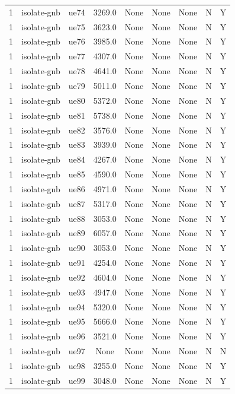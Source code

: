\begin{table}[ht]
\begin{tabular}{|c|c|c|c|c|c|c|c|c|}
1 & isolate-gnb & ue74 & 3269.0 & None & None & None & N & Y \\
1 & isolate-gnb & ue75 & 3623.0 & None & None & None & N & Y \\
1 & isolate-gnb & ue76 & 3985.0 & None & None & None & N & Y \\
1 & isolate-gnb & ue77 & 4307.0 & None & None & None & N & Y \\
1 & isolate-gnb & ue78 & 4641.0 & None & None & None & N & Y \\
1 & isolate-gnb & ue79 & 5011.0 & None & None & None & N & Y \\
1 & isolate-gnb & ue80 & 5372.0 & None & None & None & N & Y \\
1 & isolate-gnb & ue81 & 5738.0 & None & None & None & N & Y \\
1 & isolate-gnb & ue82 & 3576.0 & None & None & None & N & Y \\
1 & isolate-gnb & ue83 & 3939.0 & None & None & None & N & Y \\
1 & isolate-gnb & ue84 & 4267.0 & None & None & None & N & Y \\
1 & isolate-gnb & ue85 & 4590.0 & None & None & None & N & Y \\
1 & isolate-gnb & ue86 & 4971.0 & None & None & None & N & Y \\
1 & isolate-gnb & ue87 & 5317.0 & None & None & None & N & Y \\
1 & isolate-gnb & ue88 & 3053.0 & None & None & None & N & Y \\
1 & isolate-gnb & ue89 & 6057.0 & None & None & None & N & Y \\
1 & isolate-gnb & ue90 & 3053.0 & None & None & None & N & Y \\
1 & isolate-gnb & ue91 & 4254.0 & None & None & None & N & Y \\
1 & isolate-gnb & ue92 & 4604.0 & None & None & None & N & Y \\
1 & isolate-gnb & ue93 & 4947.0 & None & None & None & N & Y \\
1 & isolate-gnb & ue94 & 5320.0 & None & None & None & N & Y \\
1 & isolate-gnb & ue95 & 5666.0 & None & None & None & N & Y \\
1 & isolate-gnb & ue96 & 3521.0 & None & None & None & N & Y \\
1 & isolate-gnb & ue97 & None & None & None & None & N & N \\
1 & isolate-gnb & ue98 & 3255.0 & None & None & None & N & Y \\
1 & isolate-gnb & ue99 & 3048.0 & None & None & None & N & Y \\

\end{tabular}
\end{table}
